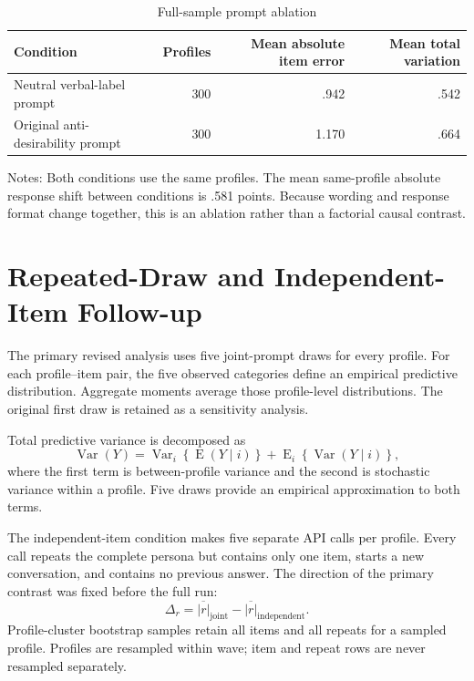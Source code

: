 \documentclass[11pt]{article}
\begin{document}
\begin{table}[!htbp]
\centering
\caption{Full-sample prompt ablation}
\label{tab:s2-prompt}
\begin{threeparttable}
\small
\begin{tabular}{lrrr}
\toprule
Condition & Profiles & Mean absolute item error & Mean total variation \\
\midrule
Neutral verbal-label prompt & 300 & .942 & .542 \\
Original anti-desirability prompt & 300 & 1.170 & .664 \\
\bottomrule
\end{tabular}
\begin{tablenotes}[flushleft]
\footnotesize
\item Notes: Both conditions use the same profiles. The mean same-profile absolute response shift
between conditions is .581 points. Because wording and response format change together, this is an
ablation rather than a factorial causal contrast.
\end{tablenotes}
\end{threeparttable}
\end{table}

\section{Repeated-Draw and Independent-Item Follow-up}

The primary revised analysis uses five joint-prompt draws for every profile. For each
profile--item pair, the five observed categories define an empirical predictive distribution.
Aggregate moments average those profile-level distributions. The original first draw is retained
as a sensitivity analysis.

Total predictive variance is decomposed as
\begin{equation}
  \operatorname{Var}(Y)
  =
  \operatorname{Var}_{i}\!\left\{\operatorname{E}(Y\mid i)\right\}
  +
  \operatorname{E}_{i}\!\left\{\operatorname{Var}(Y\mid i)\right\},
\end{equation}
where the first term is between-profile variance and the second is stochastic variance within a
profile. Five draws provide an empirical approximation to both terms.

The independent-item condition makes five separate API calls per profile. Every call repeats the
complete persona but contains only one item, starts a new conversation, and contains no previous
answer. The direction of the primary contrast was fixed before the full run:
\[
  \Delta_r
  =
  \overline{|r|}_{\mathrm{joint}}
  -
  \overline{|r|}_{\mathrm{independent}}.
\]
Profile-cluster bootstrap samples retain all items and all repeats for a sampled profile. Profiles
are resampled within wave; item and repeat rows are never resampled separately.
\end{document}
